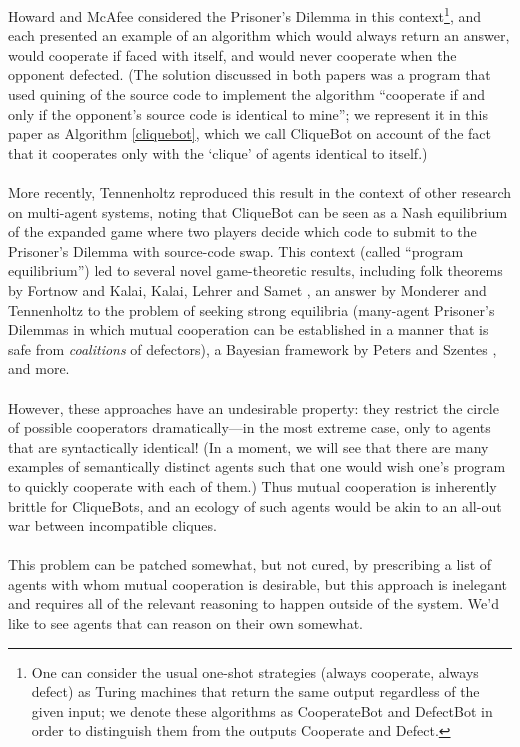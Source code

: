 \documentclass[12pt, letterpaper]{article}
\numberwithin{equation}{section}
\begin{document}
Howard \cite{Howard} and McAfee \cite{McAfee} considered the Prisoner's Dilemma in this context\footnote{One can consider the usual one-shot strategies (always cooperate, always defect) as Turing machines that return the same output regardless of the given input; we denote these algorithms as CooperateBot and DefectBot in order to distinguish them from the outputs Cooperate and Defect.}, and each presented an example of an algorithm which would always return an answer, would cooperate if faced with itself, and would never cooperate when the opponent defected. (The solution discussed in both papers was a program that used quining of the source code to implement the algorithm ``cooperate if and only if the opponent's source code is identical to mine''; we represent it in this paper as Algorithm \ref{cliquebot}, which we call CliqueBot on account of the fact that it cooperates only with the `clique' of agents identical to itself.)
\\
\\ More recently, Tennenholtz \cite{Tennenholtz} reproduced this result in the context of other research on multi-agent systems, noting that CliqueBot can be seen as a Nash equilibrium of the expanded game where two players decide which code to submit to the Prisoner's Dilemma with source-code swap. This context (called ``program equilibrium'') led to several novel game-theoretic results, including folk theorems by Fortnow \cite{Fortnow} and Kalai, Kalai, Lehrer and Samet \cite{KKLS}, an answer by Monderer and Tennenholtz \cite{MT} to the problem of seeking strong equilibria (many-agent Prisoner's Dilemmas in which mutual cooperation can be established in a manner that is safe from \emph{coalitions} of defectors), a Bayesian framework by Peters and Szentes \cite{PS}, and more.
\\
\\ However, these approaches have an undesirable property: they restrict the circle of possible cooperators dramatically---in the most extreme case, only to agents that are syntactically identical! (In a moment, we will see that there are many examples of semantically distinct agents such that one would wish one's program to quickly cooperate with each of them.) Thus mutual cooperation is inherently brittle for CliqueBots, and an ecology of such agents would be akin to an all-out war between incompatible cliques.
\\
\\This problem can be patched somewhat, but not cured, by prescribing a list of agents with whom mutual cooperation is desirable, but this approach is inelegant and requires all of the relevant reasoning to happen outside of the system. We'd like to see agents that can reason on their own somewhat.
\end{document}
